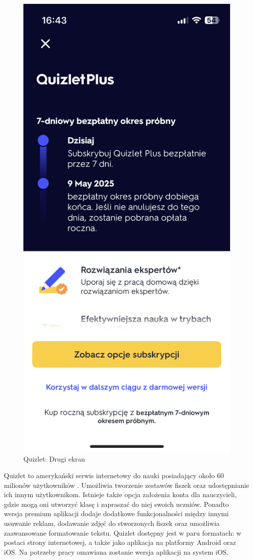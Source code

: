 \documentclass[final,a4paper,openany,12pt]{mwbk}
\begin{document}
\begin{figure}[H]
\begin{minipage}{0.5\textwidth}
  \includegraphics[width=.75\linewidth]{img/quizlet2.PNG}
  \caption{Quizlet: Drugi ekran}
  \label{fig:quizlet2}
\end{minipage}
\end{figure}

Quizlet \cite{quizlet_appstore} to amerykański serwis internetowy do nauki posiadający około 60 milionów użytkowników \cite{quizlet_about}. Umożliwia tworzenie zestawów fiszek oraz udostępnianie ich innym użytkownikom. Istnieje także opcja założenia konta dla nauczycieli, gdzie mogą oni utworzyć klasę i zapraszać do niej swoich uczniów. Ponadto wersja premium aplikacji dodaje dodatkowe funkcjonalności między innymi usuwanie reklam, dodawanie zdjęć do stworzonych fiszek oraz umożliwia zaawansowane formatowanie tekstu. Quizlet dostępny jest w paru formatach: w postaci strony internetowej, a także jako aplikacja na platformy Android oraz iOS. Na potrzeby pracy omawiana zostanie wersja aplikacji na system iOS. 
\end{document}

